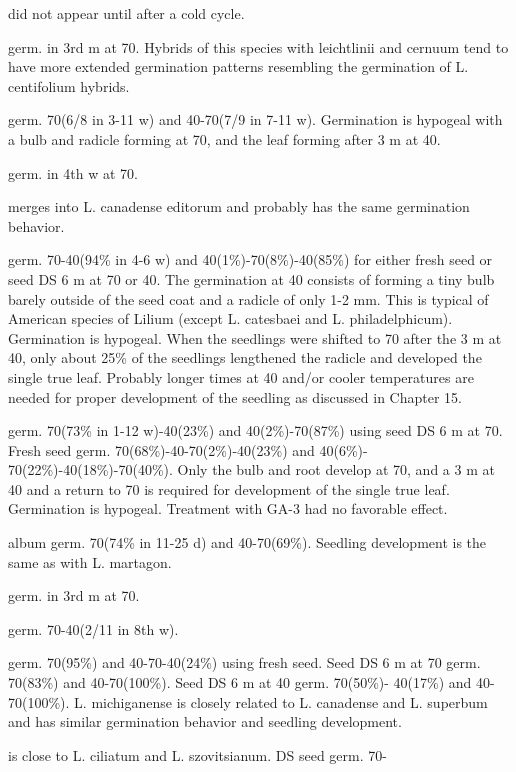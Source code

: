 \begin{description}
did not appear until after a cold cycle.
\item[L. davidi] germ. in 3rd m at 70. Hybrids of this species with leichtlinii and
cernuum tend to have more extended germination patterns resembling the
germination of L. centifolium hybrids.
\item[L. debile] germ. 70(6/8 in 3-11 w) and 40-70(7/9 in 7-11 w). Germination is
hypogeal with a bulb and radicle forming at 70, and the leaf forming after 3 m at 40.
\item[L. formosanum] germ. in 4th w at 70.
\item[L. grayi] merges into L. canadense editorum and probably has the same
germination behavior.
\item[L. kelleyanum] germ. 70-40(94\% in 4-6 w) and 40(1\%)-70(8\%)-40(85\%) for
either fresh seed or seed DS 6 m at 70 or 40. The germination at 40 consists of
forming a tiny bulb barely outside of the seed coat and a radicle of only 1-2 mm. This
is typical of American species of Lilium (except L. catesbaei and L. philadelphicum).
Germination is hypogeal. When the seedlings were shifted to 70 after the 3 m at 40,
only about 25\% of the seedlings lengthened the radicle and developed the single true
leaf. Probably longer times at 40 and/or cooler temperatures are needed for proper
development of the seedling as discussed in Chapter 15.
\item[L. martagon] germ. 70(73\% in 1-12 w)-40(23\%) and 40(2\%)-70(87\%) using
seed DS 6 m at 70. Fresh seed germ. 70(68\%)-40-70(2\%)-40(23\%) and 40(6\%)-
70(22\%)-40(18\%)-70(40\%). Only the bulb and root develop at 70, and a 3 m at 40
and a return to 70 is required for development of the single true leaf. Germination is
hypogeal. Treatment with GA-3 had no favorable effect.
\item[L. martagon] album germ. 70(74\% in 11-25 d) and 40-70(69\%). Seedling
development is the same as with L. martagon.
\item[L. maximowiczii] germ. in 3rd m at 70.
\item[L. michauxii] germ. 70-40(2/11 in 8th w).
\item[L. michiganense] germ. 70(95\%) and 40-70-40(24\%) using fresh seed. Seed
DS 6 m at 70 germ. 70(83\%) and 40-70(100\%). Seed DS 6 m at 40 germ. 70(50\%)-
40(17\%) and 40-70(100\%). L. michiganense is closely related to L. canadense and L.
superbum and has similar germination behavior and seedling development.
\item[L. monadelphum] is close to L. ciliatum and L. szovitsianum. DS seed germ. 70-

\end{description}
